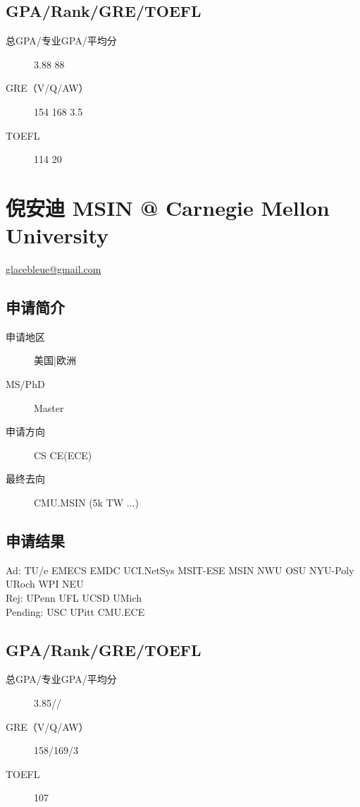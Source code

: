 \documentclass[11pt,fleqn,openany]{book} %
\begin{document}
\subsection*{GPA/Rank/GRE/TOEFL}
\begin{description}
\item[总GPA/专业GPA/平均分] 3.88 88
\item[GRE（V/Q/AW）] 154 168 3.5
\item[TOEFL] 114 20
\end{description}

\clearpage
\section{倪安迪 MSIN @ Carnegie Mellon University}
\hfill \href{mailto:glacebleue@gmail.com}{glacebleue@gmail.com}

\noindent\begin{minipage}[t]{0.45\textwidth}
\subsection*{申请简介}
\begin{description}
\item[申请地区] 美国|欧洲
\item[MS/PhD] Master
\item[申请方向] CS CE(ECE)
\item[最终去向] CMU.MSIN (5k TW ...)
\end{description}
\end{minipage}
\hfill
\begin{minipage}[t]{0.45\textwidth}
\subsection*{申请结果}
\noindent Ad: TU/e EMECS EMDC UCI.NetSys MSIT-ESE MSIN NWU OSU NYU-Poly URoch WPI NEU\\
Rej: UPenn UFL UCSD UMich\\
Pending: USC UPitt CMU.ECE
\end{minipage}
\subsection*{GPA/Rank/GRE/TOEFL}
\begin{description}
\item[总GPA/专业GPA/平均分] 3.85//
\item[GRE（V/Q/AW）] 158/169/3
\item[TOEFL] 107
\end{description}
\end{document}

